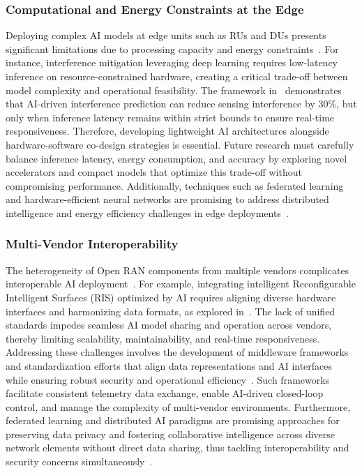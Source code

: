 \documentclass[sigconf]{acmart}
\begin{document}
\subsubsection{Computational and Energy Constraints at the Edge}
Deploying complex AI models at edge units such as RUs and DUs presents significant limitations due to processing capacity and energy constraints~\cite{ref48,ref54}. For instance, interference mitigation leveraging deep learning requires low-latency inference on resource-constrained hardware, creating a critical trade-off between model complexity and operational feasibility. The framework in~\cite{ref48} demonstrates that AI-driven interference prediction can reduce sensing interference by 30\%, but only when inference latency remains within strict bounds to ensure real-time responsiveness. Therefore, developing lightweight AI architectures alongside hardware-software co-design strategies is essential. Future research must carefully balance inference latency, energy consumption, and accuracy by exploring novel accelerators and compact models that optimize this trade-off without compromising performance. Additionally, techniques such as federated learning and hardware-efficient neural networks are promising to address distributed intelligence and energy efficiency challenges in edge deployments~\cite{ref54}.

\subsubsection{Multi-Vendor Interoperability}
The heterogeneity of Open RAN components from multiple vendors complicates interoperable AI deployment~\cite{ref49,ref54}. For example, integrating intelligent Reconfigurable Intelligent Surfaces (RIS) optimized by AI requires aligning diverse hardware interfaces and harmonizing data formats, as explored in~\cite{ref49}. The lack of unified standards impedes seamless AI model sharing and operation across vendors, thereby limiting scalability, maintainability, and real-time responsiveness. Addressing these challenges involves the development of middleware frameworks and standardization efforts that align data representations and AI interfaces while ensuring robust security and operational efficiency~\cite{ref54}. Such frameworks facilitate consistent telemetry data exchange, enable AI-driven closed-loop control, and manage the complexity of multi-vendor environments. Furthermore, federated learning and distributed AI paradigms are promising approaches for preserving data privacy and fostering collaborative intelligence across diverse network elements without direct data sharing, thus tackling interoperability and security concerns simultaneously~\cite{ref54}.
\end{document}
